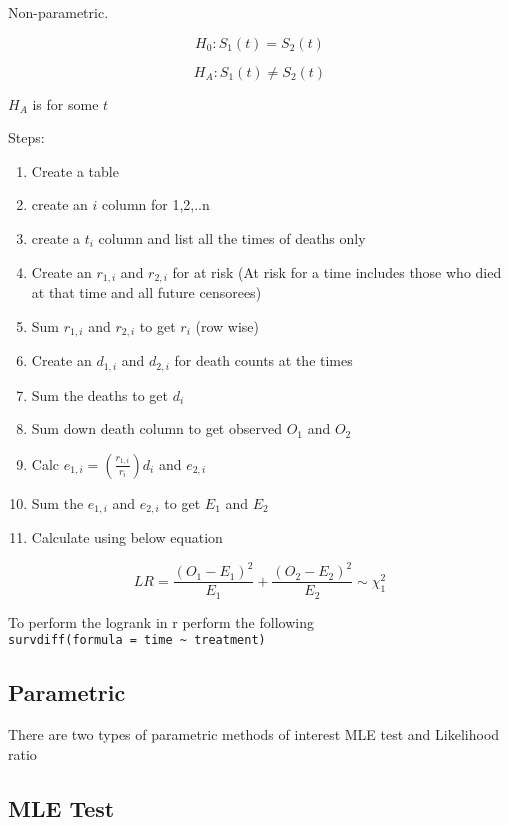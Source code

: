 \documentclass[
  letterpaper,
  DIV=11,
  numbers=noendperiod]{scrreprt}
\providecommand{\tightlist}{%
  \setlength{\itemsep}{0pt}\setlength{\parskip}{0pt}}\usepackage{longtable,booktabs,array}
\begin{document}
Non-parametric.

\[ H_0 : S_1(t) = S_2(t)\]

\[ H_A : S_1(t) \neq S_2(t)\]

\(H_A\) is for some \(t\)

Steps:

\begin{enumerate}
\def\labelenumi{\arabic{enumi})}
\tightlist
\item
  Create a table
\item
  create an \(i\) column for 1,2,..n
\item
  create a \(t_i\) column and list all the times of deaths only
\item
  Create an \(r_{1,i}\) and \(r_{2,i}\) for at risk (At risk for a time
  includes those who died at that time and all future censorees)
\item
  Sum \(r_{1,i}\) and \(r_{2,i}\) to get \(r_i\) (row wise)
\item
  Create an \(d_{1,i}\) and \(d_{2,i}\) for death counts at the times
\item
  Sum the deaths to get \(d_i\)
\item
  Sum down death column to get observed \(O_1\) and \(O_2\)
\item
  Calc \(e_{1,i} = (\frac{r_{1,i}}{r_i})d_i\) and \(e_{2,i}\)
\item
  Sum the \(e_{1,i}\) and \(e_{2,i}\) to get \(E_1\) and \(E_2\)
\item
  Calculate using below equation
\end{enumerate}

\[ LR = \frac{(O_1 - E_1)^2}{E_1} + \frac{(O_2 - E_2)^2}{E_2} \sim \chi^2_{1}\]

To perform the logrank in r perform the following
\texttt{survdiff(formula\ =\ \textquotesingle{}time\ \textasciitilde{}\ treatment\textquotesingle{})}

\hypertarget{parametric}{%
\subsection{Parametric}\label{parametric}}

There are two types of parametric methods of interest MLE test and
Likelihood ratio

\hypertarget{mle-test}{%
\subsection{MLE Test}\label{mle-test}}
\end{document}
